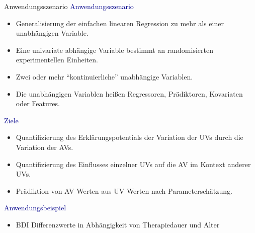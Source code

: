 \documentclass[
  8pt,
  ignorenonframetext,
]{beamer}
\providecommand{\tightlist}{%
  \setlength{\itemsep}{0pt}\setlength{\parskip}{0pt}}
\begin{document}
\begin{frame}{Anwendungsszenario}
\protect\hypertarget{anwendungsszenario}{}
\textcolor{darkblue}{Anwendungsszenario}

\small

\begin{itemize}
\tightlist
\item
  Generalisierung der einfachen linearen Regression zu mehr als einer
  unabhängigen Variable.
\item
  Eine univariate abhängige Variable bestimmt an randomisierten
  experimentellen Einheiten.
\item
  Zwei oder mehr ``kontinuierliche'' unabhängige Variablen.
\item
  Die unabhängigen Variablen heißen Regressoren, Prädiktoren, Kovariaten
  oder Features. \vspace{2mm}
\end{itemize}

\normalsize

\textcolor{darkblue}{Ziele}

\small

\begin{itemize}
\tightlist
\item
  Quantifizierung des Erklärungspotentials der Variation der UVs durch
  die Variation der AVs.
\item
  Quantifizierung des Einflusses einzelner UVs auf die AV im Kontext
  anderer UVs.
\item
  Prädiktion von AV Werten aus UV Werten nach Parameterschätzung.
  \vspace{2mm}
\end{itemize}

\normalsize

\textcolor{darkblue}{Anwendungsbeispiel}

\small

\begin{itemize}
\tightlist
\item
  BDI Differenzwerte in Abhängigkeit von Therapiedauer und Alter
\end{itemize}
\end{frame}
\end{document}
